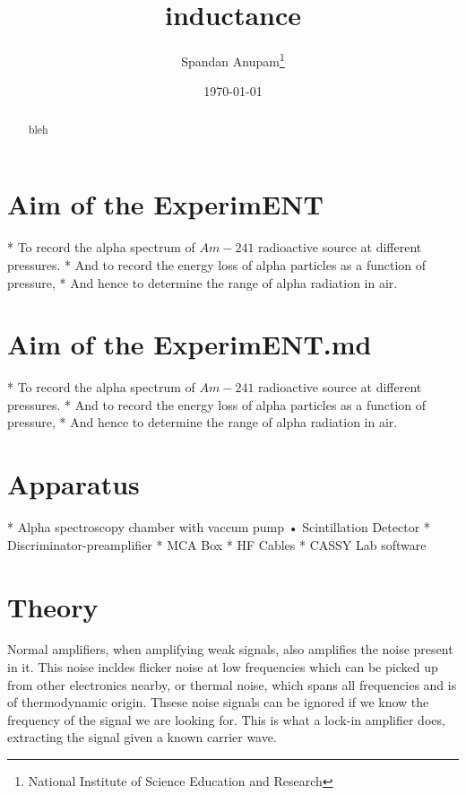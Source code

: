 \documentclass{ieeeconf}
\begin{document}
\title{inductance}

\author{Spandan Anupam\thanks{National Institute of Science Education and Research}}

\date{\today}
\maketitle

\begin{abstract}

bleh


\end{abstract}
\section{Aim of the ExperimENT}

* To record the alpha spectrum of $Am-241$ radioactive source at different pressures.
* And to record the energy loss of alpha particles as a function of pressure,
* And hence to determine the range of alpha radiation in air.

\section{Aim of the ExperimENT.md}

* To record the alpha spectrum of $Am-241$ radioactive source at different pressures.
* And to record the energy loss of alpha particles as a function of pressure,
* And hence to determine the range of alpha radiation in air.

\section{Apparatus}

* Alpha spectroscopy chamber with vaccum pump • Scintillation Detector
* Discriminator-preamplifier
* MCA Box
* HF Cables
* CASSY Lab software

\section{Theory}

Normal amplifiers, when amplifying weak signals, also amplifies the noise present in it. This noise incldes flicker noise at low frequencies which can be picked up from other electronics nearby, or thermal noise, which spans all frequencies and is of thermodynamic origin. Thsese noise signals can be ignored if we know the frequency of the signal we are looking for. This is what a lock-in amplifier does, extracting the signal given a known carrier wave.
\end{document}
